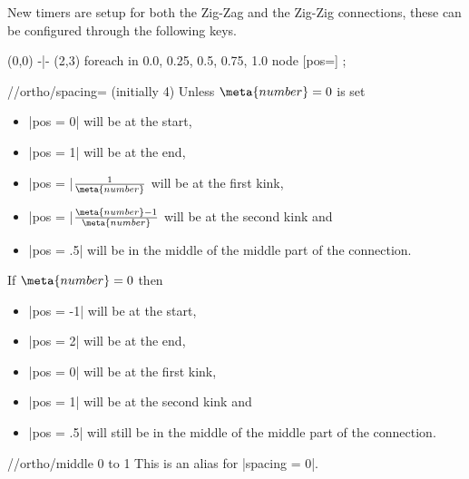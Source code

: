 New timers are setup for both the Zig-Zag and the Zig-Zig connections,
these can be configured through the following keys.
\begin{codeexample}[width=8cm,preamble=\usetikzlibrary{ext.paths.ortho}]
\tikz \draw (0,0) -|- (2,3) 
  foreach \p in {0.0, 0.25, 0.5, 0.75, 1.0}{
    node [pos=\p] {\p}};
\end{codeexample}
\begin{key}{/\tikzext/ortho/spacing= (initially 4)}
  Unless $\meta{number} = 0$ is set
  \begin{itemize}
  \item |pos = 0| will be at the start,
  \item |pos = 1| will be at the end,
  \item |pos = |$\frac{1}{\meta{number}}$ will be at the first kink,
  \item |pos = |$\frac{\meta{number}-1}{\meta{number}}$ will be at the second kink and
  \item |pos = .5| will be in the middle of the middle part of the connection.
  \end{itemize}
  
  If $\meta{number} = 0$ then
  \begin{itemize}
  \item |pos = -1| will be at the start,
  \item |pos = 2| will be at the end,
  \item |pos = 0| will be at the first kink,
  \item |pos = 1| will be at the second kink and
  \item |pos = .5| will still be in the middle of the middle part of the connection.
  \end{itemize}
\end{key}
\begin{key}{/\tikzext/ortho/middle 0 to 1}
  This is an alias for |spacing = 0|.
\end{key}

